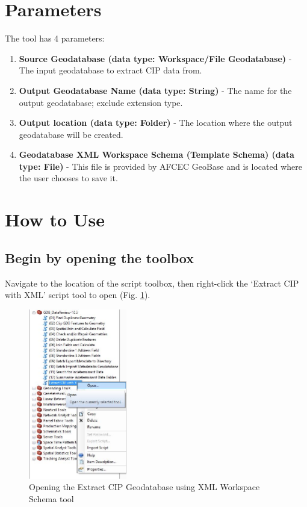 \documentclass[openany]{book}
\providecommand{\tightlist}{%
  \setlength{\itemsep}{0pt}\setlength{\parskip}{0pt}}
\theoremstyle{definition}
\theoremstyle{definition}
\theoremstyle{definition}
\theoremstyle{remark}
\begin{document}
\section{Parameters}\label{parameters}

The tool has 4 parameters:

\begin{enumerate}
\def\labelenumi{\arabic{enumi}.}
\tightlist
\item
  \textbf{Source Geodatabase (data type: Workspace/File Geodatabase)} -
  The input geodatabase to extract CIP data from.
\item
  \textbf{Output Geodatabase Name (data type: String)} - The name for
  the output geodatabase; exclude extension type.
\item
  \textbf{Output location (data type: Folder)} - The location where the
  output geodatabase will be created.
\item
  \textbf{Geodatabase XML Workspace Schema (Template Schema) (data type:
  File)} - This file is provided by AFCEC GeoBase and is located where
  the user chooses to save it.
\end{enumerate}

\section{How to Use}\label{how-to-use}

\subsection{Begin by opening the
toolbox}\label{begin-by-opening-the-toolbox}

Navigate to the location of the script toolbox, then right-click the
`Extract CIP with XML' script tool to open (Fig. \ref{fig:xCIPopen}).

\begin{figure}[H]

{\centering \includegraphics[width=1.69in,]{figures/xCIP-open} 

}

\caption{Opening the Extract CIP Geodatabase using XML Workspace Schema tool}\label{fig:xCIPopen}
\end{figure}
\end{document}
